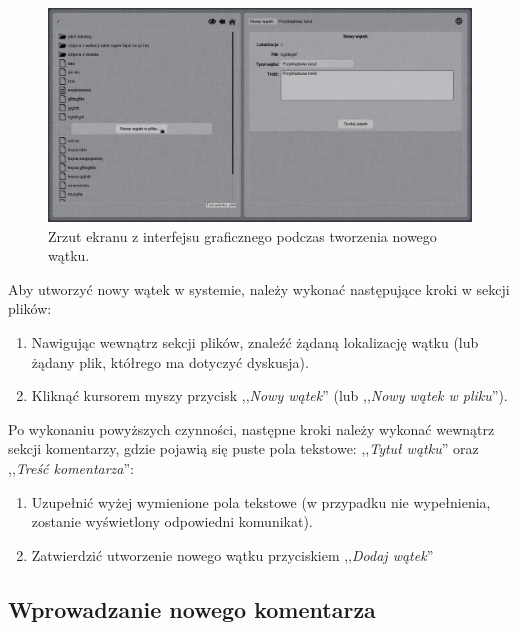 \documentclass[polish,a4paper,twoside]{ppfcmthesis}
\begin{document}
\begin{figure}[h!]
  \vspace{5pt}
  \begin{center}
    \includegraphics[width=400pt]{figures/screenshotnewthread1.png}
  \end{center}
  \caption{Zrzut ekranu z interfejsu graficznego podczas tworzenia nowego wątku.}
\end{figure}

Aby utworzyć nowy wątek w systemie, należy wykonać następujące kroki w sekcji plików:

\begin{enumerate}[noitemsep]
  \item Nawigując wewnątrz sekcji plików, znaleźć żądaną lokalizację wątku (lub żądany plik, któłrego ma dotyczyć dyskusja).
  
  \item Kliknąć kursorem myszy przycisk ,,\emph{Nowy wątek}'' (lub ,,\emph{Nowy wątek w pliku}'').
\end{enumerate}

Po wykonaniu powyższych czynności, następne kroki należy wykonać wewnątrz sekcji komentarzy, gdzie pojawią się puste pola tekstowe: ,,\emph{Tytuł wątku}'' oraz ,,\emph{Treść komentarza}'':

\begin{enumerate}[noitemsep]
  \item Uzupełnić wyżej wymienione pola tekstowe (w przypadku nie wypełnienia, zostanie wyświetlony odpowiedni komunikat).
  
  \item Zatwierdzić utworzenie nowego wątku przyciskiem ,,\emph{Dodaj wątek}''
\end{enumerate}

\subsection*{Wprowadzanie nowego komentarza}
\end{document}
